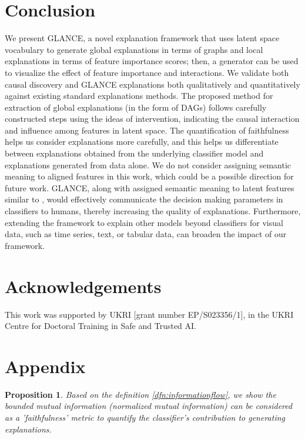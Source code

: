 \documentclass{article}
\newtheorem{prp}{Proposition}
\begin{document}
\section{Conclusion}
We present GLANCE, a novel explanation framework that uses latent space vocabulary to generate %
global explanations in terms of graphs and %
local explanations in terms of feature importance scores; %
then, a
generator can be used to visualize the effect of feature importance and interactions.
We validate both causal discovery and GLANCE explanations both qualitatively and quantitatively against existing standard explanations methods.
The proposed method for extraction of global %
explanations (in the form of DAGs) follows carefully constructed steps using the ideas of intervention, indicating the causal interaction and influence among features in latent space.
The quantification of faithfulness helps us consider explanations %
more carefully, and this helps us differentiate between explanations obtained from the underlying classifier model and explanations generated from data alone.
We do not consider assigning semantic meaning to aligned features in this work, which could be a possible direction for future work. 
 GLANCE, along with assigned semantic meaning to latent features similar to \cite{ghorbani2019towards}, would effectively communicate the decision making parameters in classifiers to humans, thereby increasing the quality of explanations.
Furthermore, extending the framework to explain other  models beyond classifiers for visual data, such as time series, text, or tabular data, can broaden the impact of our framework.


\section*{Acknowledgements}
This work was supported by UKRI [grant number EP/S023356/1], in the UKRI Centre for Doctoral Training in Safe and Trusted AI.



\section{Appendix}
\label{section:appendix}

\begin{prp}
Based on the definition \ref{dfn:informationflow}, we show the bounded mutual information (normalized mutual information) can be considered as a 'faithfulness' metric to quantify the classifier's contribution to generating explanations.
\end{prp}
\end{document}
